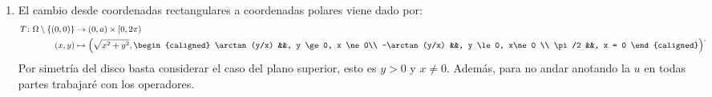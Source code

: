 \begin{Solucion}
\begin{enumerate}[label=(\alph*), topsep=3pt, itemsep=2pt]
\item El cambio desde coordenadas rectangulares a
	coordenadas polares viene dado por:
	\begin{displaymath}
	\begin{aligned}
		T \colon \Omega \setminus \left\{ (0,0) \right\} &\to (0, a) \times [0, 2\pi)\\
		(x,y) &\mapsto 
		\left( \sqrt{x^2 + y^2}, 
		\begin{caligned}
			\arctan(y/x) &&, y \ge 0, x \ne 0\\
			-\arctan(y/x) &&, y \le 0, x\ne 0 \\
			\pi/2 &&, x = 0
		\end{caligned}
		\right)
	\end{aligned}.
	\end{displaymath}
	Por simetría del disco basta considerar el caso del plano superior, esto es 
	\(y > 0\) y \(x \ne 0\). Además, para no andar anotando la \(u\)
	en todas partes trabajaré con los operadores. 


\end{enumerate}
\end{Solucion}
